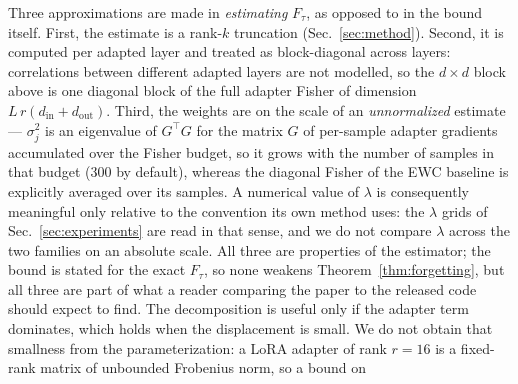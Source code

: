 Three approximations are made in \emph{estimating} $F_\tau$, as opposed to in the bound
itself. First, the estimate is a rank-$k$ truncation (Sec.~\ref{sec:method}). Second, it is
computed per adapted layer and treated as block-diagonal across layers: correlations between
different adapted layers are not modelled, so the $d\times d$ block above is one diagonal
block of the full adapter Fisher of dimension $L\,r(d_{\text{in}}+d_{\text{out}})$. Third,
the weights are on the scale of an \emph{unnormalized} estimate --- $\sigma_j^2$ is an
eigenvalue of $G^{\top}G$ for the matrix $G$ of per-sample adapter gradients accumulated over
the Fisher budget, so it grows with the number of samples in that budget ($300$ by default),
whereas the diagonal Fisher of the EWC baseline is explicitly averaged over its samples. A numerical value of $\lambda$ is consequently meaningful only relative to the
convention its own method uses: the $\lambda$ grids of Sec.~\ref{sec:experiments} are read
in that sense, and we do not compare $\lambda$ across the two families on an absolute
scale.
All three are properties of the estimator; the bound is stated for the exact $F_\tau$, so
none weakens Theorem~\ref{thm:forgetting}, but all three are part of what a reader comparing
the paper to the released code should expect to find.
The decomposition is useful only if the adapter term dominates, which holds when the
displacement is small. We do not obtain that smallness from the parameterization: a LoRA
adapter of rank $r=16$ is a fixed-rank matrix of unbounded Frobenius norm, so a bound on
